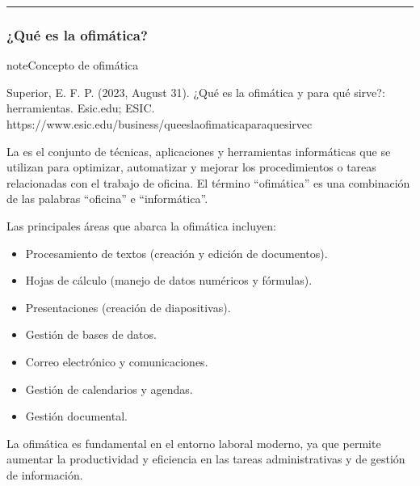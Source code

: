 \documentclass[letterpaper,10pt,spanish]{sphinxmanual}
\begin{document}
\bigskip\hrule\bigskip



\subsubsection{¿Qué es la ofimática?}
\label{\detokenize{1_guias/10ofimatica/G1011:que-es-la-ofimatica}}
\begin{sphinxadmonition}{note}{Concepto de ofimática}

\sphinxAtStartPar
%
\begin{footnote}[1]\sphinxAtStartFootnote
Superior, E. F. P. (2023, August 31). ¿Qué es la ofimática y para qué sirve?: herramientas. Esic.edu; ESIC. https://www.esic.edu/business/que\sphinxhyphen{}es\sphinxhyphen{}la\sphinxhyphen{}ofimatica\sphinxhyphen{}para\sphinxhyphen{}que\sphinxhyphen{}sirve\sphinxhyphen{}c
%
\end{footnote} La  es el conjunto de técnicas, aplicaciones y herramientas informáticas que se utilizan para optimizar, automatizar y mejorar los procedimientos o tareas relacionadas con el trabajo de oficina. El término “ofimática” es una combinación de las palabras “oficina” e “informática”.

\sphinxAtStartPar
Las principales áreas que abarca la ofimática incluyen:
\begin{itemize}
\item {} 
\sphinxAtStartPar
Procesamiento de textos (creación y edición de documentos).

\item {} 
\sphinxAtStartPar
Hojas de cálculo (manejo de datos numéricos y fórmulas).

\item {} 
\sphinxAtStartPar
Presentaciones (creación de diapositivas).

\item {} 
\sphinxAtStartPar
Gestión de bases de datos.

\item {} 
\sphinxAtStartPar
Correo electrónico y comunicaciones.

\item {} 
\sphinxAtStartPar
Gestión de calendarios y agendas.

\item {} 
\sphinxAtStartPar
Gestión documental.

\end{itemize}

\sphinxAtStartPar
La ofimática es fundamental en el entorno laboral moderno, ya que permite aumentar la productividad y eficiencia en las tareas administrativas y de gestión de información.
\end{sphinxadmonition}
\end{document}
